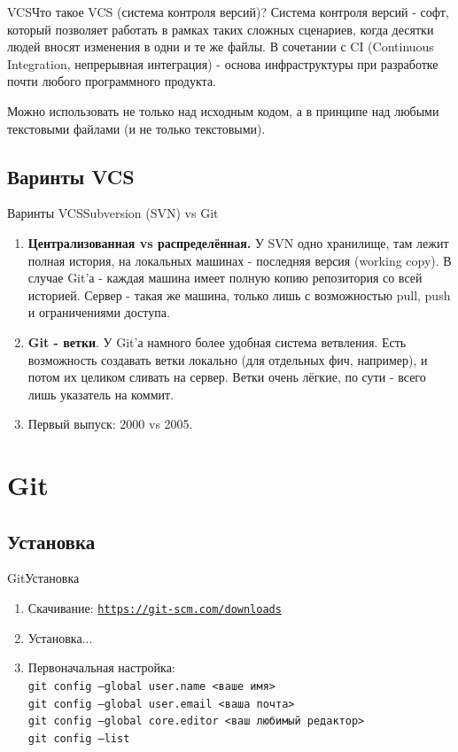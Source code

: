 \documentclass[10pt]{beamer}
\begin{document}
\begin{frame}[fragile]{VCS}{Что такое VCS (система контроля версий)?}
Система контроля версий - софт, который позволяет работать в рамках таких сложных сценариев, когда десятки людей вносят изменения в одни и те же файлы. В сочетании с CI (Continuous Integration, непрерывная интеграция) - основа инфраструктуры при разработке почти любого программного продукта. 

Можно использовать не только над исходным кодом, а в принципе над любыми текстовыми файлами (и не только текстовыми).
\end{frame}

\subsection{Варинты VCS}
\begin{frame}[fragile]{Варинты VCS}{Subversion (SVN) vs Git}
\begin{enumerate}
\item \textbf{Централизованная  vs распределённая.} У SVN одно хранилище, там лежит полная история, на локальных машинах - последняя версия (working copy). В случае Git'а - каждая машина имеет полную копию репозитория со всей историей. Сервер - такая же машина, только лишь с возможностью pull, push и ограничениями доступа.
\item \textbf{Git - ветки}. У Git'а намного более удобная система ветвления. Есть возможность создавать ветки локально (для отдельных фич, например), и потом их целиком сливать на сервер. Ветки очень лёгкие, по сути - всего лишь указатель на коммит.
\item  Первый выпуск: 2000 vs 2005.
\end{enumerate}
\end{frame}

\section{Git}
\subsection{Установка}

\begin{frame}[fragile]{Git}{Установка}
\begin{enumerate}
\item Скачивание: \href{https://git-scm.com/downloads}{\texttt{https://git-scm.com/downloads}}
\item Установка...
\item Первоначальная настройка: \\
\texttt{git config --global user.name <ваше имя>}\\
\texttt{git config --global user.email <ваша почта>}\\
\texttt{git config --global core.editor <ваш любимый редактор>}\\
\texttt{git config --list}
\end{enumerate}
\end{frame}
\end{document}
